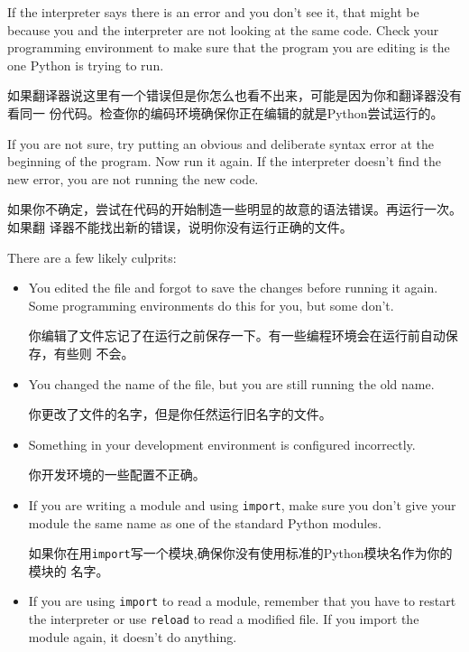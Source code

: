\documentclass[10pt]{book}
\begin{document}
\begin{CJK}{UTF8}{gbsn}
If the interpreter says there is an error and you don't see it, that
might be because you and the interpreter are not looking at the same
code.  Check your programming environment to make sure that the
program you are editing is the one Python is trying to run.

如果翻译器说这里有一个错误但是你怎么也看不出来，可能是因为你和翻译器没有看同一
份代码。检查你的编码环境确保你正在编辑的就是Python尝试运行的。

If you are not sure, try putting an obvious and deliberate syntax
error at the beginning of the program.  Now run it again.  If the
interpreter doesn't find the new error, you are not running the
new code.

如果你不确定，尝试在代码的开始制造一些明显的故意的语法错误。再运行一次。如果翻
译器不能找出新的错误，说明你没有运行正确的文件。

There are a few likely culprits:

\begin{itemize}

\item You edited the file and forgot to save the changes before
running it again.  Some programming environments do this
for you, but some don't.

你编辑了文件忘记了在运行之前保存一下。有一些编程环境会在运行前自动保存，有些则
不会。

\item You changed the name of the file, but you are still running
the old name.

你更改了文件的名字，但是你任然运行旧名字的文件。

\item Something in your development environment is configured
incorrectly.

你开发环境的一些配置不正确。

\item If you are writing a module and using {\tt import},
make sure you don't give your module the same name as one
of the standard Python modules.

如果你在用{\tt import}写一个模块,确保你没有使用标准的Python模块名作为你的模块的
名字。

\item If you are using {\tt import} to read a module, remember
that you have to restart the interpreter or use {\tt reload}
to read a modified file.  If you import the module again, it
doesn't do anything.


\end{itemize}
\end{CJK}
\end{document}
